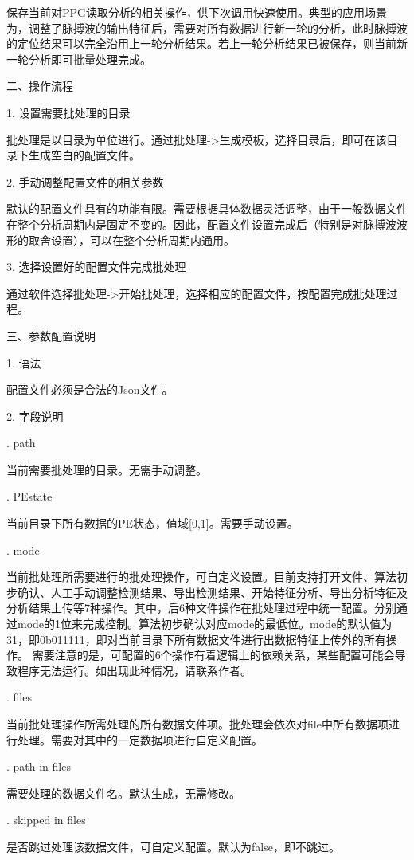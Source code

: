 {保存当前对PPG读取分析的相关操作，供下次调用快速使用。典型的应用场景为，调整了脉搏波的输出特征后，需要对所有数据进行新一轮的分析，此时脉搏波的定位结果可以完全沿用上一轮分析结果。若上一轮分析结果已被保存，则当前新一轮分析即可批量处理完成。

二、操作流程

1. 设置需要批处理的目录

批处理是以目录为单位进行。通过批处理->生成模板，选择目录后，即可在该目录下生成空白的配置文件。

2. 手动调整配置文件的相关参数

默认的配置文件具有的功能有限。需要根据具体数据灵活调整，由于一般数据文件在整个分析周期内是固定不变的。因此，配置文件设置完成后（特别是对脉搏波波形的取舍设置），可以在整个分析周期内通用。

3. 选择设置好的配置文件完成批处理

通过软件选择批处理->开始批处理，选择相应的配置文件，按配置完成批处理过程。

三、参数配置说明

1. 语法

配置文件必须是合法的Json文件。

2. 字段说明

. path 

当前需要批处理的目录。无需手动调整。

. PEstate

当前目录下所有数据的PE状态，值域[0,1]。需要手动设置。

. mode

当前批处理所需要进行的批处理操作，可自定义设置。目前支持打开文件、算法初步确认、人工手动调整检测结果、导出检测结果、开始特征分析、导出分析特征及分析结果上传等7种操作。其中，后6种文件操作在批处理过程中统一配置。分别通过mode的1位来完成控制。算法初步确认对应mode的最低位。mode的默认值为31，即0b011111，即对当前目录下所有数据文件进行出数据特征上传外的所有操作。
需要注意的是，可配置的6个操作有着逻辑上的依赖关系，某些配置可能会导致程序无法运行。如出现此种情况，请联系作者。

. files

当前批处理操作所需处理的所有数据文件项。批处理会依次对file中所有数据项进行处理。需要对其中的一定数据项进行自定义配置。

. path in files

需要处理的数据文件名。默认生成，无需修改。

. skipped in files

是否跳过处理该数据文件，可自定义配置。默认为false，即不跳过。

}
